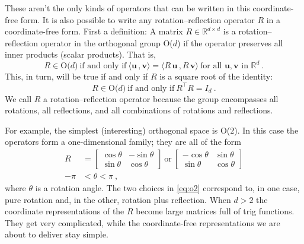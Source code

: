 \documentclass{article}
\newcommand{\Evec}[1]{{\mathbf{#1}}} %
\newcommand{\inner}[2]{\langle{#1}\,,{#2}\rangle}
\begin{document}
These aren't the only kinds of operators that can be written in this coordinate-free form.
It is also possible to write any rotation--reflection operator $R$ in a coordinate-free form.
First a definition: A matrix $R\in\mathbb{R}^{d\times d}$ is a rotation--reflection operator in the orthogonal group O($d$) if the operator preserves all inner products (scalar products).
That is,
\begin{equation}
    R \in \mbox{O($d$)} ~ \mbox{if and only if} ~ \inner{\Evec{u}}{\Evec{v}}=\inner{R\,\Evec{u}}{R\,\Evec{v}} ~ \mbox{for all $\Evec{u},\Evec{v}$ in $\mathbb{R}^d$} ~.\label{eq:orth1}
\end{equation}
This, in turn, will be true if and only if $R$ is a square root of the identity:
\begin{equation}
    R \in \mbox{O($d$)} ~ \mbox{if and only if} ~ R^\top R=I_d ~.\label{eq:orth2}
\end{equation}
We call $R$ a rotation--reflection operator because the group encompasses all rotations, all reflections, and all combinations of rotations and reflections.

For example, the simplest (interesting) orthogonal space is O($2$). In this case the operators form a one-dimensional family; they are all of the form
\begin{align}
    R &= \begin{bmatrix}\cos{\theta} & -\sin{\theta} \\ \sin{\theta} & \cos{\theta}\end{bmatrix} ~\mbox{or}~
    \begin{bmatrix}-\cos{\theta} & \sin{\theta} \\ \sin{\theta} & \cos{\theta}\end{bmatrix} \label{eq:o2}
    \\
    -\pi &< \theta < \pi ~, \nonumber
\end{align}
where $\theta$ is a rotation angle.
The two choices in \eqref{eq:o2} correspond to, in one case, pure rotation and, in the other, rotation plus reflection.
When $d>2$ the coordinate representations of the $R$ become large matrices full of trig functions.
They get very complicated, while the coordinate-free representations we are about to deliver stay simple.
\end{document}
